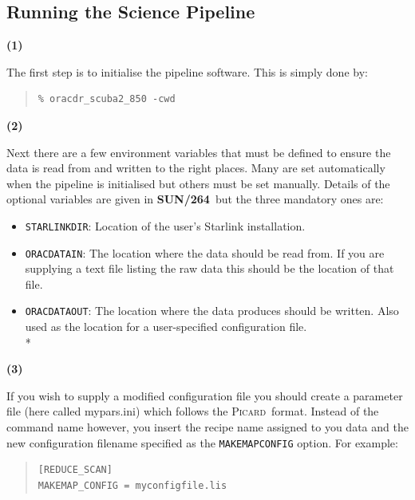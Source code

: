 \documentclass[twoside,11pt]{article}
\newcommand{\xref}[3]{#1}
\newcommand{\xlabel}[1]{}
\renewcommand{\_}{\texttt{\symbol{95}}}
\newenvironment{myquote}{\begin{quote}\begin{small}}{\end{small}\end{quote}}
\newcommand{\picard}{\xref{\textsc{Picard}}{sun265}{}}
\newcommand{\param}[1]{\texttt{#1}}
\newcommand{\pipelinesun}{\xref{\textbf{SUN/264}}{sun264}{}}
\begin{document}
\subsection{\xlabel{running_pl}Running the Science Pipeline}
\begin{minipage}[t]{0.05\linewidth}
\textbf{(1)}
\end{minipage}
\begin{minipage}[t]{0.95\linewidth}
The first step is to initialise the pipeline software. This is simply done by:
 \begin{myquote}
\begin{verbatim}
% oracdr_scuba2_850 -cwd

\end{verbatim}
\end{myquote}
\end{minipage}

\begin{minipage}[t]{0.05\linewidth}
\textbf{(2)}
\end{minipage}
\begin{minipage}[t]{0.95\linewidth}
Next there are a few  environment variables that must be defined to ensure the data is read from and written to the right places. Many are set automatically when the pipeline is initialised but others must be set manually. Details of the optional variables are given in  \pipelinesun\ but the three mandatory ones are:
\begin{itemize}\itemsep-0.1em
\item \param{STARLINK\_DIR}: Location of the user's Starlink installation.
\item \param{ORAC\_DATA\_IN}: The location where the data should be read from. If you are supplying a text file listing the raw data this should be the location of that file.
\item \param{ORAC\_DATA\_OUT}: The location where the data produces should be written. Also used as the location for a user-specified configuration file.\\*
\end{itemize}
\end{minipage}

\begin{minipage}[t]{0.05\linewidth}
\textbf{(3)}
\end{minipage}
\begin{minipage}[t]{0.95\linewidth}
If you wish to supply a modified configuration file you should create a parameter file (here called mypars.ini)  which follows the \picard\ format. Instead of the command name however, you insert the recipe name assigned to you data and the new configuration filename specified as the \texttt{MAKEMAP\_CONFIG} option. For example:
 \begin{myquote}
\begin{verbatim}
[REDUCE_SCAN]
MAKEMAP_CONFIG = myconfigfile.lis
 \end{verbatim}
\end{myquote}
\end{minipage}
\end{document}
